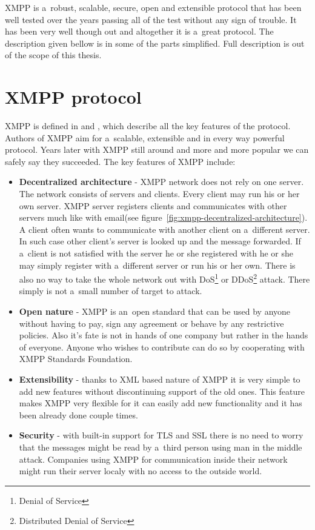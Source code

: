 XMPP is a~robust, scalable, secure, open and extensible protocol that has been well tested over the years passing all of the test without any sign of trouble. It has been very well though out and altogether it is a~great protocol. The description given bellow is in some of the parts simplified. Full description is out of the scope of this thesis.   

\section{XMPP protocol}
XMPP is defined in \cite{xmppCoreRFC} and \cite{xmppIMRFC}, which describe all the key features of the protocol. Authors of XMPP aim for a~scalable, extensible and in every way powerful protocol. Years later with XMPP still around and more and more popular we can safely say they succeeded. The key features of XMPP include:

\begin{itemize}
	\item \textbf{Decentralized architecture} - XMPP network does not rely on one server. The network consists of servers and clients. Every client may run his or her own server. XMPP server registers clients and communicates with other servers much like with email(see figure~\ref{fig:xmpp-decentralized-architecture}). A client often wants to communicate with another client on a~different server. In such case other client's server is looked up and the message forwarded. If a~client is not satisfied with the server he or she registered with he or she may simply register with a~different server or run his or her own. There is also no way to take the whole network out with DoS\footnote{Denial of Service} or DDoS\footnote{Distributed Denial of Service} attack. There simply is not a~small number of target to attack.    
	\item  \textbf{Open nature} - XMPP is an~open standard that can be used by anyone without having to pay, sign any agreement or behave by any restrictive policies. Also it's fate is not in hands of one company but rather in the hands of everyone. Anyone who wishes to contribute can do so by cooperating with XMPP Standards Foundation. 
	\item \textbf{Extensibility} - thanks to XML based nature of XMPP it is very simple to add new features without discontinuing support of the old ones. This feature makes XMPP very flexible for it can easily add new functionality and it has been already done couple times.  
	\item \textbf{Security} - with built-in support for TLS and SSL there is no need to worry that the messages might be read by a~third person using man in the middle attack. Companies using XMPP for communication inside their network might run their server localy with no access to the outside world.  
\end{itemize}


